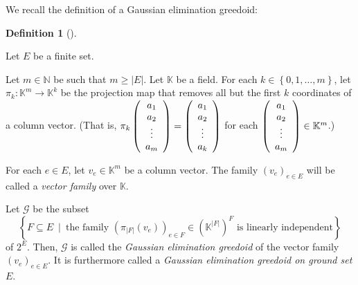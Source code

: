 \documentclass[numbers=enddot,12pt,final,onecolumn,notitlepage]{scrartcl}%
\theoremstyle{definition}
\newtheorem{defi}[theo]{Definition}
\newenvironment{definition}[1][]
{\begin{defi}[#1]\begin{leftbar}}
{\end{leftbar}\end{defi}}
\renewcommand{\geq}{\geqslant}
\theoremstyle{plainsl}
\begin{document}
We recall the definition of a Gaussian elimination greedoid:

\begin{definition}
\label{def.geg}Let $E$ be a finite set.

Let $m\in\mathbb{N}$ be such that $m\geq\left\vert E\right\vert $. Let
$\mathbb{K}$ be a field. For each $k\in\left\{  0,1,\ldots,m\right\}  $, let
$\pi_{k}:\mathbb{K}^{m}\rightarrow\mathbb{K}^{k}$ be the projection map that
removes all but the first $k$ coordinates of a column vector. (That is,
$\pi_{k}\left(
\begin{array}
[c]{c}%
a_{1}\\
a_{2}\\
\vdots\\
a_{m}%
\end{array}
\right)  =\left(
\begin{array}
[c]{c}%
a_{1}\\
a_{2}\\
\vdots\\
a_{k}%
\end{array}
\right)  $ for each $\left(
\begin{array}
[c]{c}%
a_{1}\\
a_{2}\\
\vdots\\
a_{m}%
\end{array}
\right)  \in\mathbb{K}^{m}$.)

For each $e\in E$, let $v_{e}\in\mathbb{K}^{m}$ be a column vector. The family
$\left(  v_{e}\right)  _{e\in E}$ will be called a \textit{vector family} over
$\mathbb{K}$.

Let $\mathcal{G}$ be the subset%
\[
\left\{  F\subseteq E\ \mid\ \text{the family }\left(  \pi_{\left\vert
F\right\vert }\left(  v_{e}\right)  \right)  _{e\in F}\in\left(
\mathbb{K}^{\left\vert F\right\vert }\right)  ^{F}\text{ is linearly
independent}\right\}
\]
of $2^{E}$. Then, $\mathcal{G}$ is called the \textit{Gaussian elimination
greedoid} of the vector family $\left(  v_{e}\right)  _{e\in E}$. It is
furthermore called a \textit{Gaussian elimination greedoid on ground set }$E$.
\end{definition}
\end{document}
